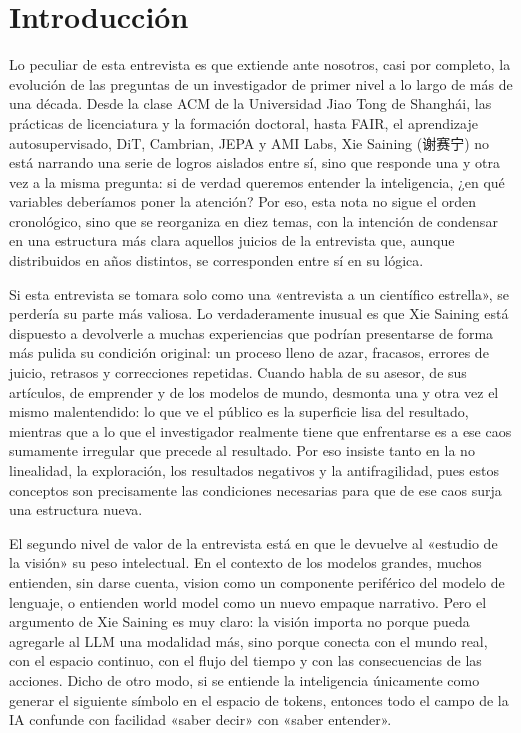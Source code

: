 \section*{Introducción}

Lo peculiar de esta entrevista es que extiende ante nosotros, casi por completo, la evolución de las preguntas de un investigador de primer nivel a lo largo de más de una década. Desde la clase ACM de la Universidad Jiao Tong de Shanghái, las prácticas de licenciatura y la formación doctoral, hasta FAIR, el aprendizaje autosupervisado, DiT, Cambrian, JEPA y AMI Labs, Xie Saining (谢赛宁) no está narrando una serie de logros aislados entre sí, sino que responde una y otra vez a la misma pregunta: si de verdad queremos entender la inteligencia, ¿en qué variables deberíamos poner la atención? Por eso, esta nota no sigue el orden cronológico, sino que se reorganiza en diez temas, con la intención de condensar en una estructura más clara aquellos juicios de la entrevista que, aunque distribuidos en años distintos, se corresponden entre sí en su lógica.

Si esta entrevista se tomara solo como una «entrevista a un científico estrella», se perdería su parte más valiosa. Lo verdaderamente inusual es que Xie Saining está dispuesto a devolverle a muchas experiencias que podrían presentarse de forma más pulida su condición original: un proceso lleno de azar, fracasos, errores de juicio, retrasos y correcciones repetidas. Cuando habla de su asesor, de sus artículos, de emprender y de los modelos de mundo, desmonta una y otra vez el mismo malentendido: lo que ve el público es la superficie lisa del resultado, mientras que a lo que el investigador realmente tiene que enfrentarse es a ese caos sumamente irregular que precede al resultado. Por eso insiste tanto en la no linealidad, la exploración, los resultados negativos y la antifragilidad, pues estos conceptos son precisamente las condiciones necesarias para que de ese caos surja una estructura nueva.

El segundo nivel de valor de la entrevista está en que le devuelve al «estudio de la visión» su peso intelectual. En el contexto de los modelos grandes, muchos entienden, sin darse cuenta, vision como un componente periférico del modelo de lenguaje, o entienden world model como un nuevo empaque narrativo. Pero el argumento de Xie Saining es muy claro: la visión importa no porque pueda agregarle al LLM una modalidad más, sino porque conecta con el mundo real, con el espacio continuo, con el flujo del tiempo y con las consecuencias de las acciones. Dicho de otro modo, si se entiende la inteligencia únicamente como generar el siguiente símbolo en el espacio de tokens, entonces todo el campo de la IA confunde con facilidad «saber decir» con «saber entender».

